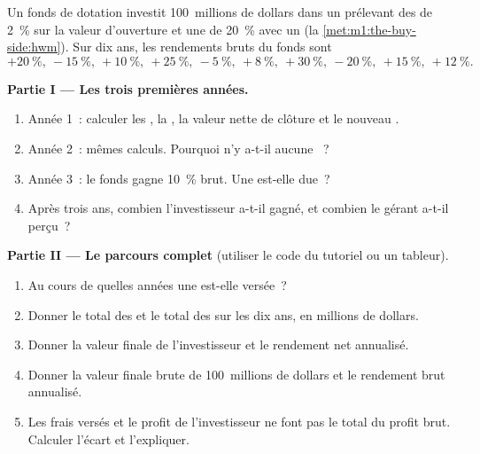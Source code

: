 \begin{problem}\label{pb:m1:the-buy-side:1}
Un fonds de dotation investit 100~millions de dollars dans un  prélevant des  de 2~\% sur la valeur d'ouverture et une  de 20~\% avec un 
(la \cref{met:m1:the-buy-side:hwm}). Sur dix ans, les rendements bruts du fonds
sont
\[
+20~\%,\ -15~\%,\ +10~\%,\ +25~\%,\ -5~\%,\ +8~\%,\ +30~\%,\ -20~\%,\ +15~\%,\ +12~\%.
\]

\medskip\noindent\textbf{Partie I --- Les trois premières années.}
\begin{enumerate}
\item Année 1~: calculer les , la , la valeur
nette de clôture et le nouveau .
\item Année 2~: mêmes calculs. Pourquoi n'y a-t-il aucune ~?
\item Année 3~: le fonds gagne 10~\% brut. Une  est-elle due~?
\item Après trois ans, combien l'investisseur a-t-il gagné, et combien le
gérant a-t-il perçu~?
\end{enumerate}

\medskip\noindent\textbf{Partie II --- Le parcours complet} (utiliser le code du tutoriel
ou un tableur).
\begin{enumerate}[resume]
\item Au cours de quelles années une  est-elle versée~?
\item Donner le total des  et le total des  sur
les dix ans, en millions de dollars.
\item Donner la valeur finale de l'investisseur et le rendement net annualisé.
\item Donner la valeur finale brute de 100~millions de dollars et le rendement
brut annualisé.
\item Les frais versés et le profit de l'investisseur ne font pas le total du
profit brut. Calculer l'écart et l'expliquer.
\end{enumerate}


\end{problem}

